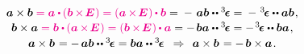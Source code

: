 \nopagebreak
\begin{equation}\label{crossproductoftwovectors}
\begin{array}{c}
\bm{a} \times \bm{b}
\mathcolor{magenta}{%
= \bm{a} \dotp \hspace{-0.1ex}
\left(
   \bm{b}
   \hspace{-0.1ex} \times \hspace{-0.25ex}
   \UnitDyad
   \hspace{.1ex} \right)
= \left(
   \bm{a}
   \hspace{-0.1ex} \times \hspace{-0.25ex}
   \UnitDyad
   \hspace{.1ex} \right)
\hspace{-0.1ex} \dotp \bm{b}%
}
= \tikzmark{HEADabdotdotpermutations} - \hspace{.25ex} \bm{a} \bm{b} \dotdotp \permutationsparitytensor \tikzmark{abdotdotpermutationsTAIL}
= \tikzmark{HEADpermutationsdotdotab} - \hspace{.2ex} \permutationsparitytensor \dotdotp \bm{a} \bm{b} \tikzmark{permutationsdotdotabTAIL}
\hspace{.15ex} ,
\\[.15em]
%
\bm{b} \times \bm{a}
\mathcolor{magenta}{%
= \bm{b} \dotp \hspace{-0.1ex}
\left(
   \bm{a}
   \hspace{-0.1ex} \times \hspace{-0.25ex}
   \UnitDyad \hspace{.1ex} \right)
= \left(
   \bm{b}
   \hspace{-0.1ex} \times \hspace{-0.25ex}
   \UnitDyad
   \hspace{.1ex} \right)
\hspace{-0.1ex} \dotp \bm{a}%
}
= - \hspace{.25ex} \bm{b} \bm{a} \dotdotp \permutationsparitytensor
= - \hspace{.2ex} \permutationsparitytensor \dotdotp \bm{b} \bm{a}
\hspace{.15ex} ,
\\[.2em]
%
\bm{a} \times \bm{b} \hspace{.16ex}
= - \hspace{.33ex} \bm{a} \bm{b} \dotdotp \permutationsparitytensor
= \bm{b} \bm{a} \dotdotp \permutationsparitytensor
\hspace{.5em} \Rightarrow \hspace{.44em}
\bm{a} \times \bm{b} \hspace{.2ex} = - \hspace{.3ex} \bm{b} \times \bm{a}
\hspace{.2ex} .
\end{array}
\end{equation}%
